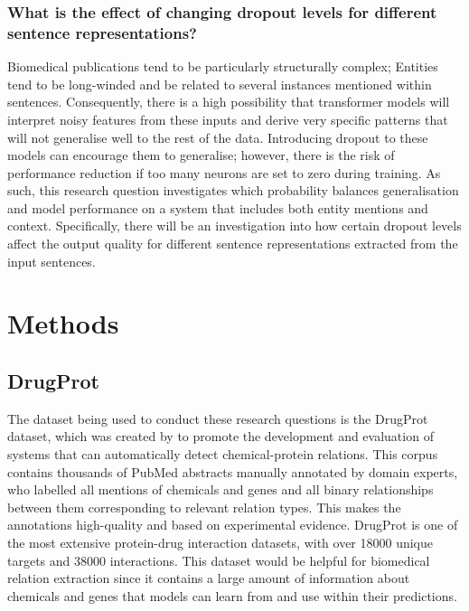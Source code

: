 \documentclass{l4proj}
\begin{document}
\newpage
\subsection{What is the effect of changing dropout levels for different sentence representations?}

Biomedical publications tend to be particularly structurally complex; Entities tend to be long-winded and be related to several instances mentioned within sentences. Consequently, there is a high possibility that transformer models will interpret noisy features from these inputs and derive very specific patterns that will not generalise well to the rest of the data. Introducing dropout to these models can encourage them to generalise; however, there is the risk of performance reduction if too many neurons are set to zero during training. As such, this research question investigates which probability balances generalisation and model performance on a system that includes both entity mentions and context. Specifically, there will be an investigation into how certain dropout levels affect the output quality for different sentence representations extracted from the input sentences.

\chapter{Methods}

\section{DrugProt}
The dataset being used to conduct these research questions is the DrugProt dataset, which was created by \cite{dataset} to promote the development and evaluation of systems that can automatically detect chemical-protein relations. This corpus contains thousands of PubMed abstracts manually annotated by domain experts, who labelled all mentions of chemicals and genes and all binary relationships between them corresponding to relevant relation types. This makes the annotations high-quality and based on experimental evidence. DrugProt is one of the most extensive protein-drug interaction datasets, with over 18000 unique targets and 38000 interactions. This dataset would be helpful for biomedical relation extraction since it contains a large amount of information about chemicals and genes that models can learn from and use within their predictions.
\end{document}
